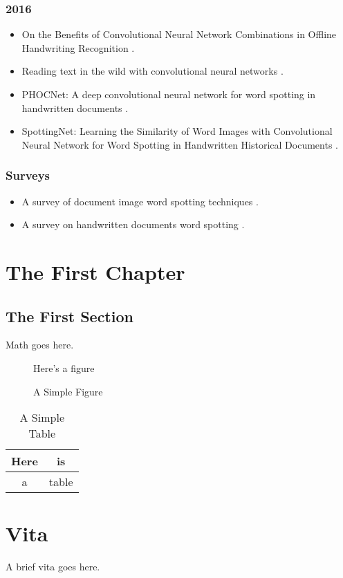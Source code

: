 \documentclass[final]{ukthesis}
\begin{document}
\subsection{2016}
\begin{itemize}
\item On the Benefits of Convolutional Neural Network Combinations in Offline Handwriting Recognition \cite{suryani2016benefits}.
\item Reading text in the wild with convolutional neural networks \cite{jaderberg2016reading}.
\item PHOCNet: A deep convolutional neural network for word spotting in handwritten documents \cite{sudholt2016phocnet}.
\item SpottingNet: Learning the Similarity of Word Images with Convolutional Neural Network for Word Spotting in Handwritten Historical Documents \cite{zhong2016spottingnet}.
\end{itemize}

\subsection{Surveys}
\begin{itemize}
\item A survey of document image word spotting techniques \cite{giotis2017survey}.

\item A survey on handwritten documents word spotting \cite{ahmed2017survey}.
\end{itemize}
\copyrightnotice

\chapter{The First Chapter}
\section{The First Section}
Math goes here.
\begin{figure}[h]
\centering
Here's a figure
\caption{A Simple Figure}
\end{figure}
\begin{table}[h]
\centering
\begin{tabular}{c|c}
Here & is \\
\hline
a & table
\end{tabular}
\caption{A Simple Table}
\end{table}
\copyrightnotice
\backmatter

\chapter{Vita}
A brief vita goes here.
\end{document}
